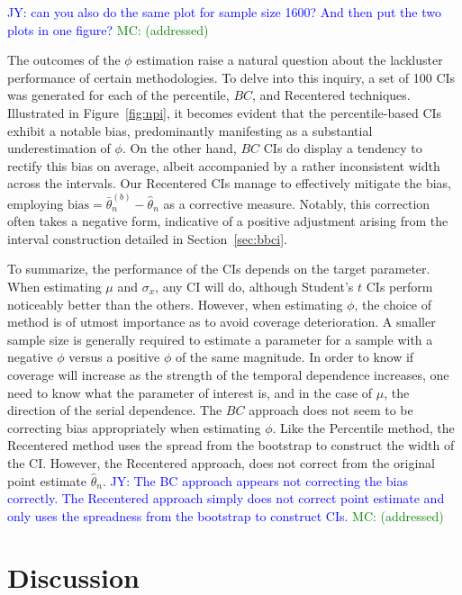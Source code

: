 \documentclass[12pt, letterpaper, titlepage]{article}
\newcommand{\jy}[1]{\textcolor{blue}{JY: #1}}
\newcommand{\mc}[1]{\textcolor{green}{MC: (#1)}}
\begin{document}
\jy{can you also do the same plot for sample size 1600? And then put the two
  plots in one figure?} \mc{addressed}

The outcomes of the $\phi$ estimation raise a natural question about the
lackluster performance of certain methodologies. To delve into this inquiry, a
set of 100 CIs was generated for each of the percentile,
$BC$, and Recentered techniques. Illustrated in Figure~\ref{fig:npi}, it becomes
evident that the percentile-based CIs exhibit a notable bias, predominantly
manifesting as a substantial underestimation of $\phi$. On the other hand, $BC$
CIs do display a tendency to rectify this bias on average, albeit accompanied by
a rather inconsistent width across the intervals. Our Recentered CIs manage to
effectively mitigate the bias, employing $\widehat{\text{bias}} =
\bar\theta_n^{(b)} - \hat\theta_n$ as a corrective measure. Notably, this
correction often takes a negative form, indicative of a positive adjustment
arising from the interval construction detailed in Section~\ref{sec:bbci}.


To summarize, the performance of the CIs depends on the target parameter. When
estimating $\mu$ and $\sigma_x$, any CI will do, although Student's $t$ CIs
perform noticeably better than the others. However, when estimating $\phi$,
the choice of method is of utmost importance as to avoid coverage
deterioration. A smaller sample size is generally required to estimate a
parameter for a sample with a negative $\phi$ versus a positive $\phi$ of the
same magnitude. In order to know if coverage will increase as the strength of
the temporal dependence increases, one need to know what the parameter of
interest is, and in the case of $\mu$, the direction of the serial dependence. The
$BC$ approach does not seem to be correcting bias appropriately when estimating
$\phi$. Like the Percentile method, the Recentered method uses the spread from the 
bootstrap to construct the width of the CI. However, the Recentered approach, does
not correct from the original point estimate $\hat\theta_n$.
\jy{The BC approach appears not correcting the bias correctly. The Recentered
  approach simply does not correct point estimate and only uses the spreadness
  from the bootstrap to construct CIs.} \mc{addressed}


\section{Discussion}
\label{sec:disc}
\end{document}
